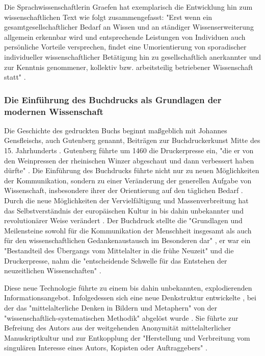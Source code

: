 Die Sprachwissenschaftlerin Graefen hat exemplarisch die Entwicklung hin zum wissenschaftlichen Text wie folgt zusammengefasst: "Erst wenn ein gesamtgesellschaftlicher Bedarf an Wissen und an ständiger Wissenserweiterung allgemein erkennbar wird und entsprechende Leistungen von Individuen auch persönliche Vorteile versprechen, findet eine Umorientierung von sporadischer individueller wissenschaftlicher Betätigung hin zu gesellschaftlich anerkannter und zur Kenntnis genommener, kollektiv bzw. arbeitsteilig betriebener Wissenschaft statt" \cite{graefen2007_wissenschaftliche_artikel}.

\subsubsection{Die Einführung des Buchdrucks als Grundlagen der modernen Wissenschaft}

Die Geschichte des gedruckten Buchs beginnt maßgeblich mit Johannes Gensfleischs, auch Gutenberg genannt, Beiträgen zur Buchdruckerkunst \cite{wittmann_1999_geschichte} Mitte des 15. Jahrhunderts \cite{suchen}. Gutenberg führte um 1460 die Druckerpresse ein, "die er von den Weinpressen der rheinischen Winzer abgeschaut und dann verbessert haben dürfte" \cite{stober_2014_pressegeschichte}. Die Einführung des Buchdrucks führte nicht nur zu neuen Möglichkeiten der Kommunikation, sondern zu einer Veränderung der generellen Aufgabe von Wissenschaft, insbesondere ihrer der Orientierung auf den täglichen Bedarf \cite{Luhmann1998}. Durch die neue Möglichkeiten der Vervielfältigung und Massenverbreitung hat das Selbstverständnis der europäischen Kultur in bis dahin unbekannter \cite{giesecke_1991_buchdruck} und revolutionärer Weise verändert \cite{wunderlich_2008_buchdruck} \cite{stober_2014_pressegeschichte}. Der Buchdruck stellte die "Grundlagen und Meilensteine sowohl für die Kommunikation der Menschheit insgesamt als auch für den wissenschaftlichen Gedankenaustausch im Besonderen dar" \cite{schirmbacher_2009_wisspub}, er war ein "Bestandteil des Übergangs vom Mittelalter in die frühe Neuzeit" \cite{lange2008medienwettbewerb} und die Druckerpresse, nahm die "entscheidende Schwelle für das Entstehen der neuzeitlichen Wissenschaften" \cite{luhmann_1997_gesellschaft}.

Diese neue Technologie führte zu einem bis dahin unbekannten, explodierenden Informationsangebot. Infolgedessen sich eine neue Denkstruktur entwickelte \cite{eisenstein_1997_druckerpresse}, bei der das "mittelalterliche Denken in Bildern und Metaphern" von der "wissenschaftlich-systematischen Methodik" abgelöst wurde \cite{wunderlich_2008_buchdruck}. Sie führte zur Befreiung des Autors aus der weitgehenden Anonymität mittelalterlicher Manuskriptkultur und zur Entkopplung der "Herstellung und Verbreitung vom singulären Interesse eines Autors, Kopisten oder Auftraggebers"\cite{wunderlich_2008_buchdruck} \cite{schirmbacher_2009_wisspub}.

